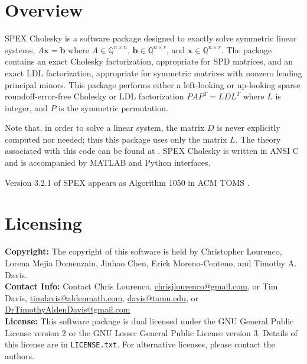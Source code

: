 \documentclass[12pt,oneside]{book}
\theoremstyle{definition}
\renewcommand{\b}{\mathbf{b}}
\newcommand{\x}{\mathbf{x}}
\begin{document}
\section{Overview} \label{s:Chol:intro}
SPEX Cholesky is a software package designed to exactly solve symmetric linear systems, $A \x = \b$ where $A \in \mathbb{Q}^{n \times
n}$, $\b \in \mathbb{Q}^{n \times r}$, and $\x \in \mathbb{Q}^{n \times
r}$. 
The package contains an exact Cholesky factorization, appropriate for SPD matrices,
and an exact LDL factorization, appropriate for symmetric matrices with nonzero
leading principal minors.
This package performs either a left-looking or up-looking sparse roundoff-error-free Cholesky or LDL factorization $P A P^T =  L D L^T$ where $L$ is integer,
and $P$ is the symmetric permutation.

Note that, in order to solve a linear system, the matrix $D$ is never explicitly computed nor needed; thus this package uses only the matrix $L$. The theory associated with this code can be found at
 \cite{lourenco2022exactly}. SPEX Cholesky is written in ANSI C and is accompanied by MATLAB and Python interfaces.

Version 3.2.1 of SPEX appears as Algorithm 1050 in ACM TOMS \cite{mejia2025algorithm}.
 
\section{Licensing} \label{s:Chol:licensing}
\textbf{Copyright:} The copyright of this software is held by  Christopher Lourenco, Lorena Mejia Domenzain, Jinhao Chen, Erick Moreno-Centeno, and Timothy A. Davis.\\

\noindent \textbf{Contact Info:} Contact Chris Lourenco,
\href{mailto:chrisjlourenco@gmail.com}{chrisjlourenco@gmail.com}, or Tim Davis,
\href{mailto:timdavis@aldenmath.com}{timdavis@aldenmath.com},
\href{mailto:davis@tamu.edu}{davis@tamu.edu}, or
\href{mailto:DrTimothyAldenDavis@gmail.com}{DrTimothyAldenDavis@gmail.com}\\

\noindent \textbf{License:} This software package is dual licensed under the GNU General Public License version 2 or the GNU Lesser General Public License version 3. Details of this license are in \verb|LICENSE.txt|. For alternative licenses, please contact the authors.
\end{document}
